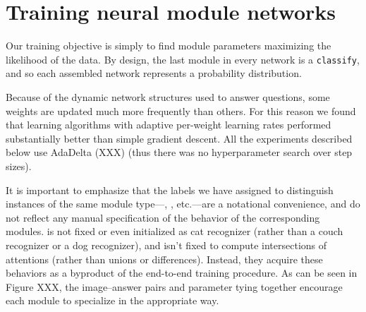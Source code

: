 \section{Training neural module networks}

Our training objective is simply to find module parameters maximizing the
likelihood of the data. By design, the last module in every network is a
{\small\tt classify}, and so each assembled network represents a probability
distribution.

Because of the dynamic network structures used to answer questions, some weights
are updated much more frequently than others. For this reason we found that
learning algorithms with adaptive per-weight learning rates performed
substantially better than simple gradient descent. All the experiments described
below use AdaDelta (XXX) (thus there was no hyperparameter search over step
sizes).

It is important to emphasize that the labels we have assigned to distinguish
instances of the same module type---, , etc.---are a
notational convenience, and do not reflect any manual specification of the
behavior of the corresponding modules.  is not fixed or even
initialized %
as cat recognizer (rather than a couch recognizer or a dog recognizer), and
 isn't fixed to compute intersections of attentions (rather
than unions or differences). Instead, they acquire these behaviors as a
byproduct of the end-to-end training procedure. As can be seen in Figure XXX,
the image--answer pairs and parameter tying together encourage each module to
specialize in the appropriate way.
